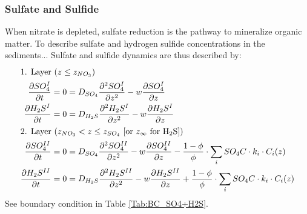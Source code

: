 \documentclass[gmd, manuscript]{copernicus}
\begin{document}
\subsubsection{Sulfate and Sulfide}
When nitrate is depleted, sulfate reduction is the pathway to mineralize organic matter.  To describe sulfate and hydrogen sulfide concentrations in the sediments...
Sulfate and sulfide dynamics are thus described by:
\begin{align}
\intertext{1. Layer ($z \leq z_{NO_3}$)}
 \frac{\partial SO_4^I}{\partial t} &= 0 = D_{SO_4} \frac{\partial^2SO_4^I }{\partial z^2} - w\frac{\partial SO_4^I }{\partial z} \label{eq:SO4_ODE1_L1}\\ %
 \frac{\partial H_2S^I}{\partial t} &= 0 = D_{H_2S} \frac{\partial^2H_2S^I }{\partial z^2} - w\frac{\partial H_2S^I }{\partial z}\label{eq:H2S_ODE1_L1}\\
 \intertext{2. Layer ($z_{NO_3} < z \leq z_{SO_4}$ [or $z_\infty$ for H$_2$S])} 
\frac{\partial SO_4^{II}}{\partial t} &= 0 = D_{SO_4} \frac{\partial^2SO_4^{II} }{\partial z^2} - w\frac{\partial SO_4^{II} }{\partial z} - \frac{1-\phi}{\phi} \cdot \sum_i SO_4C \cdot k_i \cdot C_{i}(z) \label{eq:NO3_ODE1_L2}\\
\frac{\partial H_2S^{II}}{\partial t} &= 0 = D_{H_2S} \frac{\partial^2H_2S^{II} }{\partial z^2} - w\frac{\partial H_2S^{II} }{\partial z} + \frac{1-\phi}{\phi} \cdot \sum_i SO_4C  \cdot k_i \cdot C_{i}(z)\label{eq:NH4_ODE1_L2}
\end{align}
See boundary condition in Table \ref{Tab:BC_SO4+H2S}.
\end{document}
